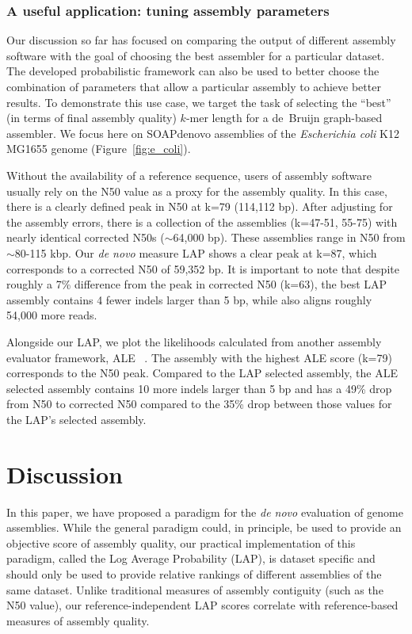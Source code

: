\subsubsection{A useful application: tuning assembly parameters}
Our discussion so far has focused on comparing the output of different
assembly software with the goal of choosing the best assembler for a
particular dataset.  The developed probabilistic framework can
also be used to better choose the combination of parameters that allow
a particular assembly to achieve better results.  To demonstrate this
use case, we target the task of selecting the ``best'' (in terms of final assembly quality) $k$-mer length
for a de~Bruijn graph-based assembler.  We focus here on SOAPdenovo
assemblies of the \emph{Escherichia coli} K12 MG1655 genome (Figure~\ref{fig:e_coli}).

Without the availability of a
reference sequence, users of assembly software usually rely on
the N50 value as a proxy for the assembly quality.  In this case,
there is a clearly defined peak in N50 at k=79 (114,112 bp).
After adjusting for the assembly errors, there is a collection of the assemblies (k=47-51, 55-75) with nearly identical corrected N50s ($\sim$64,000 bp).
These assemblies range in N50 from $\sim$80-115 kbp.
Our \emph{de novo} measure LAP shows a clear peak at k=87, which corresponds to a corrected N50 of 59,352 bp.
It is important to note that despite roughly a 7\% difference from the peak in corrected N50 (k=63), the best LAP assembly contains 4 fewer indels larger than 5 bp, while also aligns roughly 54,000 more reads.

Alongside our LAP, we plot the likelihoods calculated from another assembly evaluator framework, ALE ~\cite{clark2013ale}.
The assembly with the highest ALE score (k=79) corresponds to the N50 peak.
Compared to the LAP selected assembly, the ALE selected assembly contains 10 more indels larger than 5 bp and has a 49\% drop from N50 to corrected N50 compared to the 35\% drop between those values for the LAP's selected assembly.


\section{Discussion}
In this paper, we have proposed a paradigm for the \emph{de novo} evaluation
of genome assemblies.  While the general paradigm could, in principle,
be used to provide an objective score of assembly quality, our
practical implementation of this paradigm, called the Log Average
Probability (LAP), is dataset specific and should only be used to
provide relative rankings of different assemblies of the same
dataset. Unlike traditional measures of assembly
contiguity (such as the N50 value), our reference-independent LAP
scores correlate with reference-based measures of assembly
quality.

